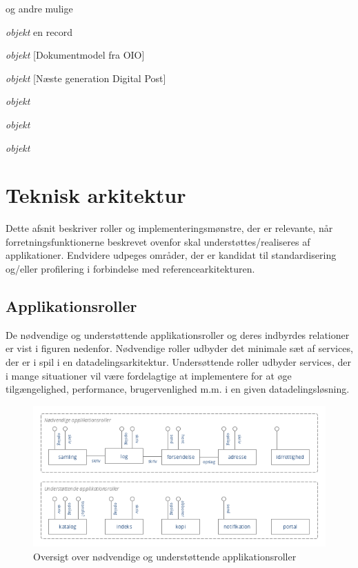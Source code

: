 og andre mulige

\begin{description}
\tightlist
\item[registeroplysning]
\emph{objekt} en record
\item[dokument]
\emph{objekt} {[}Dokumentmodel fra OIO{]}
\item[påmindelse]
\emph{objekt} {[}Næste generation Digital Post{]}
\item[registreringshændelse]
\emph{objekt}
\item[forretningshændelse]
\emph{objekt}
\item[klassifikation]
\emph{objekt}
\end{description}

\section{Teknisk arkitektur}\label{teknisk-arkitektur}

Dette afsnit beskriver roller og implementeringsmønstre, der er
relevante, når forretningsfunktionerne beskrevet ovenfor skal
understøttes/realiseres af applikationer. Endvidere udpeges områder, der
er kandidat til standardisering og/eller profilering i forbindelse med
referencearkitekturen.

\subsection{Applikationsroller}\label{applikationsroller}

De nødvendige og understøttende applikationsroller og deres indbyrdes
relationer er vist i figuren nedenfor. Nødvendige roller udbyder det
minimale sæt af services, der er i spil i en datadelingsarkitektur.
Undersøttende roller udbyder services, der i mange situationer vil være
fordelagtige at implementere for at øge tilgængelighed, performance,
brugervenlighed m.m. i en given datadelingsløsning.

\begin{figure}
\centering
\includegraphics{figures/applikationsroller.png}
\caption{Oversigt over nødvendige og understøttende applikationsroller}
\end{figure}

